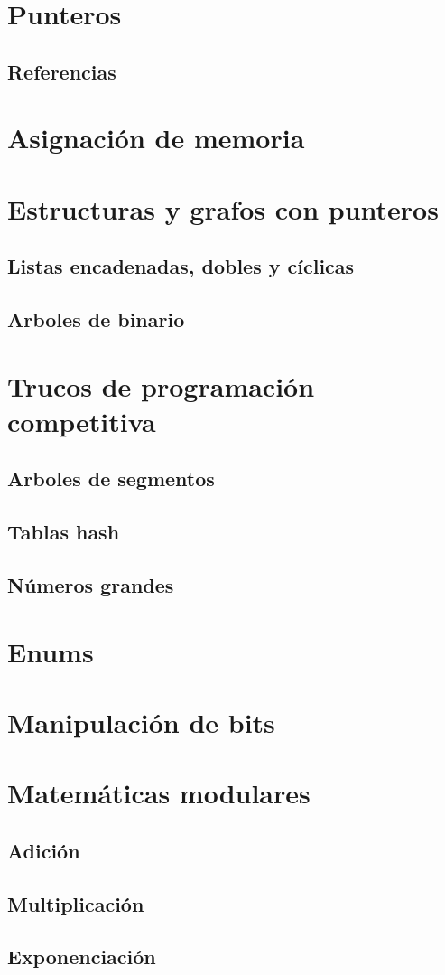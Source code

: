 \documentclass{article}
\begin{document}
\section{Punteros}

\subsection{Referencias}

\section{Asignación de memoria}

\section{Estructuras y grafos con punteros}

\subsection{Listas encadenadas, dobles y cíclicas}

\subsection{Arboles de binario}

\section{Trucos de programación competitiva}

\subsection{Arboles de segmentos}

\subsection{Tablas hash}

\subsection{Números grandes}

\section{Enums}

\section{Manipulación de bits}

\section{Matemáticas modulares}

\subsection{Adición}

\subsection{Multiplicación}

\subsection{Exponenciación}
\end{document}
